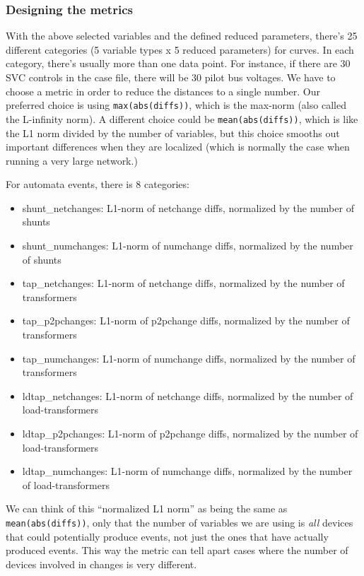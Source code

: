\documentclass[conference]{IEEEtran}
\newcommand{\code}[1]{\texttt{#1}}
\begin{document}
\subsubsection{Designing the metrics}
\label{sssec:metrics}
With the above selected variables and the defined reduced parameters,
there's 25 different categories (5 variable types x 5 reduced
parameters) for curves. In each category, there's usually more than
one data point. For instance, if there are 30 SVC controls in the case
file, there will be 30 pilot bus voltages. We have to choose a metric
in order to reduce the distances to a single number. Our preferred
choice is using \code{max(abs(diffs))}, which is the max-norm (also
called the L-infinity norm).  A different choice could be
\code{mean(abs(diffs))}, which is like the L1 norm divided by the
number of variables, but this choice smooths out important differences
when they are localized (which is normally the case when running a
very large network.)

For automata events, there is 8 categories:
\begin{itemize}
\item shunt\_netchanges: L1-norm of netchange diffs, normalized by the number of shunts
\item shunt\_numchanges: L1-norm of numchange diffs, normalized by the number of shunts
\item tap\_netchanges: L1-norm of netchange diffs, normalized by the number of transformers
\item tap\_p2pchanges: L1-norm of p2pchange diffs, normalized by the number of transformers
\item tap\_numchanges:  L1-norm of numchange diffs, normalized by the number of transformers
\item ldtap\_netchanges:  L1-norm of netchange diffs, normalized by the number of load-transformers
\item ldtap\_p2pchanges: L1-norm of p2pchange diffs, normalized by the number of load-transformers
\item ldtap\_numchanges: L1-norm of numchange diffs, normalized by the number of load-transformers
\end{itemize}  

We can think of this ``normalized L1 norm'' as being the same as
\code{mean(abs(diffs))}, only that the number of variables we are
using is \emph{all} devices that could potentially produce events, not
just the ones that have actually produced events. This way the metric
can tell apart cases where the number of devices involved in changes
is very different.
\end{document}
